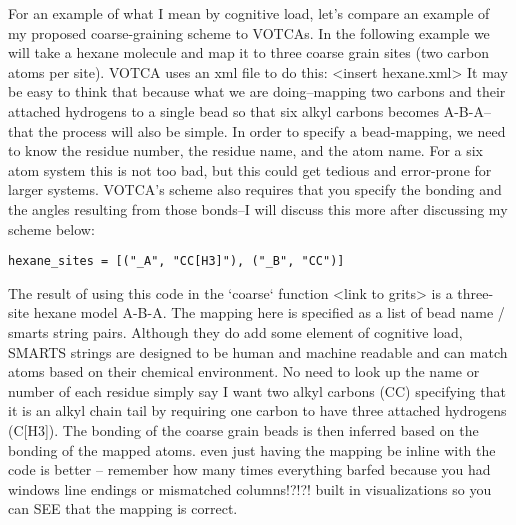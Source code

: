 For an example of what I mean by cognitive load, let's compare an example of my proposed coarse-graining scheme to VOTCAs. In the following example we will take a hexane molecule and map it to three coarse grain sites (two carbon atoms per site). VOTCA uses an xml file to do this:
<insert hexane.xml>
It may be easy to think that because what we are doing--mapping two carbons and their attached hydrogens to a single bead so that six alkyl carbons becomes A-B-A--that the process will also be simple. In order to specify a bead-mapping, we need to know the residue number, the residue name, and the atom name. For a six atom system this is not too bad, but this could get tedious and error-prone for larger systems. VOTCA's scheme also requires that you specify the bonding and the angles resulting from those bonds--I will discuss this more after discussing my scheme below:
\begin{lstlisting}
hexane_sites = [("_A", "CC[H3]"), ("_B", "CC")]
\end{lstlisting}
The result of using this code in the `coarse` function <link to grits> is a three-site hexane model A-B-A. The mapping here is specified as a list of bead name / smarts string pairs. Although they do add some element of cognitive load, SMARTS strings are designed to be human and machine readable and can match atoms based on their chemical environment. No need to look up the name or number of each residue simply say I want two alkyl carbons (CC) specifying that it is an alkyl chain tail by requiring one carbon to have three attached hydrogens (C[H3]). The bonding of the coarse grain beads is then inferred based on the bonding of the mapped atoms.
even just having the mapping be inline with the code is better -- remember how many times everything barfed because you had windows line endings or mismatched columns!?!?!
built in visualizations so you can SEE that the mapping is correct.


